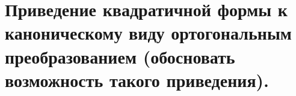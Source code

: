 \section{
    Приведение квадратичной формы к каноническому виду ортогональным преобразованием (обосновать возможность такого приведения).
}


